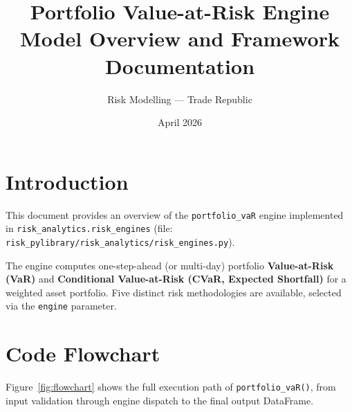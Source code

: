 \documentclass[11pt, a4paper]{article}
\title{\textbf{Portfolio Value-at-Risk Engine}\\[4pt]
\large Model Overview and Framework Documentation}
\author{Risk Modelling --- Trade Republic}
\date{April 2026}
\begin{document}
\maketitle
\tableofcontents
\newpage

\section{Introduction}

This document provides an overview of the \texttt{portfolio\_vaR} engine
implemented in \texttt{risk\_analytics.risk\_engines} (file:
\texttt{risk\_pylibrary/risk\_analytics/risk\_engines.py}).

The engine computes one-step-ahead (or multi-day) portfolio
\textbf{Value-at-Risk (VaR)} and \textbf{Conditional Value-at-Risk (CVaR,
Expected Shortfall)} for a weighted asset portfolio. Five distinct risk
methodologies are available, selected via the \texttt{engine} parameter.

\section{Code Flowchart}

Figure~\ref{fig:flowchart} shows the full execution path of
\texttt{portfolio\_vaR()}, from input validation through engine dispatch
to the final output DataFrame.
\end{document}
